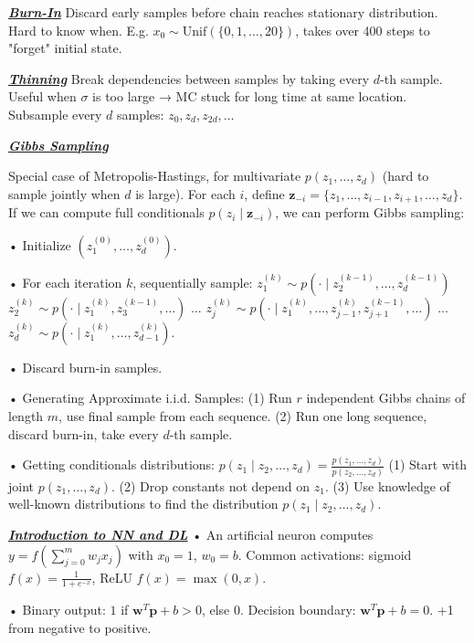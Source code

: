 \documentclass[10pt]{article}
\newcommand{\bulletPoint}[1]{\ul{\textit{\textbf{#1}}}}
\begin{document}
\begin{multicols*}{3}
\bulletPoint{Burn-In} \quad
Discard early samples before chain reaches stationary distribution. 
Hard to know when. E.g. $x_0 \sim \text{Unif}(\{0,1,\dots,20\})$, takes over 400 steps to "forget" initial state.

\bulletPoint{Thinning}\quad
Break dependencies between samples by taking every $d$-th sample. 
Useful when $\sigma$ is too large → MC stuck for long time at same location. 
Subsample every $d$ samples: $z_0, z_d, z_{2d}, \dots$

\bulletPoint{Gibbs Sampling}\quad

Special case of Metropolis-Hastings, for multivariate $p(z_1, \dots, z_d)$ (hard to sample jointly when $d$ is large). 
For each $i$, define $\mathbf{z}_{-i} = \{z_1,\dots,z_{i-1},z_{i+1},\dots,z_d\}$. 
If we can compute full conditionals $p(z_i \mid \mathbf{z}_{-i})$, we can perform Gibbs sampling:

• Initialize $(z_1^{(0)}, \dots, z_d^{(0)})$.   

• For each iteration $k$, sequentially sample:
$z_1^{(k)} \sim p(\cdot \mid z_2^{(k-1)}, \dots, z_d^{(k-1)})$  
$z_2^{(k)} \sim p(\cdot \mid z_1^{(k)}, z_3^{(k-1)}, \dots)$  
...  
$z_j^{(k)} \sim p(\cdot \mid z_1^{(k)}, \dots, z_{j-1}^{(k)}, z_{j+1}^{(k-1)}, \dots)$  
...
$z_d^{(k)} \sim p(\cdot \mid z_1^{(k)}, \dots, z_{d-1}^{(k)})$. 

• Discard burn-in samples.

• Generating Approximate i.i.d. Samples: 
(1) Run $r$ independent Gibbs chains of length $m$, use final sample from each sequence.
(2) Run one long sequence, discard burn-in, take every $d$-th sample. 

• Getting conditionals distributions:
$p(z_1 \mid z_2, \dots, z_d) = \frac{p(z_1, \dots, z_d)}{p(z_2, \dots, z_d)}$
(1) Start with joint $p(z_1, \dots, z_d)$.   
(2) Drop constants not depend on $z_1$.   
(3) Use knowledge of well-known distributions to find the distribution $p(z_1 \mid z_2, \dots, z_d)$. 





\bulletPoint{Introduction to NN and DL} \quad
• An artificial neuron computes $y = f\left(\sum_{j=0}^{m} w_j x_j\right)$ with $x_0 = 1$, $w_0 = b$. \quad
Common activations: sigmoid $f(x) = \frac{1}{1 + e^{-x}}$, ReLU $f(x) = \max(0, x)$. 

• Binary output: $1$ if $\mathbf{w}^T \mathbf{p} + b > 0$, else $0$. \quad
Decision boundary: $\mathbf{w}^T \mathbf{p} + b = 0$. \quad +1 from negative to positive.


\end{multicols*}
\end{document}
